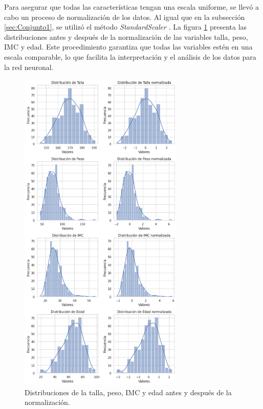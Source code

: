 Para asegurar que todas las características tengan una escala uniforme, se llevó a cabo un proceso de normalización 
de los datos. Al igual que en la subsección \ref{sec:Conjunto1}, se utilizó el método \emph{StandardScaler} \citep{CITE:50}. La 
figura \ref{fig:normalizacion2} presenta las distribuciones antes y después de la normalización de las variables talla, peso, IMC y edad. Este procedimiento garantiza que todas las variables estén en una escala comparable, 
lo que facilita la interpretación y el análisis de los datos para la red neuronal.

\begin{figure}[h!]
	\centering
	\includegraphics[width=0.7\textwidth]{./Figures/normalizacion2.png}
	\caption{Distribuciones de la talla, peso, IMC y edad antes y después de la normalización.}\label{fig:normalizacion2}
\end{figure}



